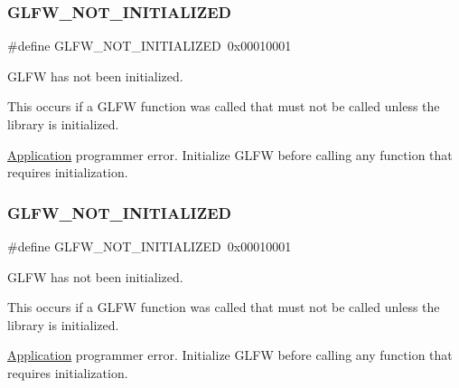 \subsubsection{\texorpdfstring{G\+L\+F\+W\+\_\+\+N\+O\+T\+\_\+\+I\+N\+I\+T\+I\+A\+L\+I\+Z\+ED}{GLFW\_NOT\_INITIALIZED}\hspace{0.1cm}{\footnotesize\ttfamily [2/5]}}
{\footnotesize\ttfamily \#define G\+L\+F\+W\+\_\+\+N\+O\+T\+\_\+\+I\+N\+I\+T\+I\+A\+L\+I\+Z\+ED~0x00010001}



G\+L\+FW has not been initialized. 

This occurs if a G\+L\+FW function was called that must not be called unless the library is initialized.

\hyperlink{classApplication}{Application} programmer error. Initialize G\+L\+FW before calling any function that requires initialization. \mbox{\label{group__errors_ga2374ee02c177f12e1fa76ff3ed15e14a}} 
\subsubsection{\texorpdfstring{G\+L\+F\+W\+\_\+\+N\+O\+T\+\_\+\+I\+N\+I\+T\+I\+A\+L\+I\+Z\+ED}{GLFW\_NOT\_INITIALIZED}\hspace{0.1cm}{\footnotesize\ttfamily [3/5]}}
{\footnotesize\ttfamily \#define G\+L\+F\+W\+\_\+\+N\+O\+T\+\_\+\+I\+N\+I\+T\+I\+A\+L\+I\+Z\+ED~0x00010001}



G\+L\+FW has not been initialized. 

This occurs if a G\+L\+FW function was called that must not be called unless the library is initialized.

\hyperlink{classApplication}{Application} programmer error. Initialize G\+L\+FW before calling any function that requires initialization. \mbox{\label{group__errors_ga2374ee02c177f12e1fa76ff3ed15e14a}} 
